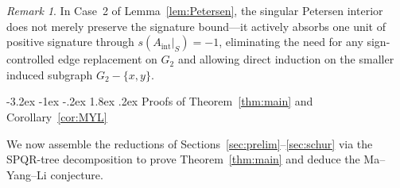 \documentclass[10pt,letterpaper]{article}
\makeatletter
\renewcommand\section{\@startsection{section}{1}{\z@}%
  {-3.2ex \@plus -1ex \@minus -.2ex}%
  {1.8ex \@plus .2ex}%
  {\normalfont\large\bfseries}}
\theoremstyle{zetaplain}
\theoremstyle{zetadef}
\theoremstyle{remark}
\newtheorem*{remark}{Remark}
\numberwithin{equation}{section}
\makeatother
\begin{document}
\begin{remark}
In Case~2 of Lemma~\ref{lem:Petersen}, the singular Petersen interior does not merely preserve the signature bound—it actively absorbs one unit of positive signature through $s(A_{\mathrm{int}}|_S) = -1$, eliminating the need for any sign-controlled edge replacement on $G_2$ and allowing direct induction on the smaller induced subgraph $G_2 - \{x, y\}$.
\end{remark}

\section{Proofs of Theorem~\ref{thm:main} and Corollary~\ref{cor:MYL}}\label{sec:proof}

We now assemble the reductions of Sections~\ref{sec:prelim}--\ref{sec:schur} via the SPQR-tree decomposition to prove Theorem~\ref{thm:main} and deduce the Ma--Yang--Li conjecture.
\end{document}
